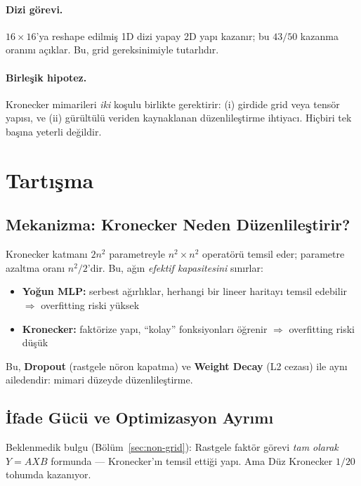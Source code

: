 \documentclass[11pt,a4paper]{article}
\begin{document}
\paragraph{Dizi görevi.}
$16 \times 16$'ya reshape edilmiş 1D dizi yapay 2D yapı kazanır;
bu $43/50$ kazanma oranını açıklar. Bu, grid gereksinimiyle
tutarlıdır.

\paragraph{Birleşik hipotez.}
Kronecker mimarileri \emph{iki} koşulu birlikte gerektirir:
(i) girdide grid veya tensör yapısı, ve (ii) gürültülü veriden
kaynaklanan düzenlileştirme ihtiyacı. Hiçbiri tek başına yeterli
değildir.


\section{Tartışma}
\label{sec:discussion}

\subsection{Mekanizma: Kronecker Neden Düzenlileştirir?}

Kronecker katmanı $2n^2$ parametreyle $n^2 \times n^2$ operatörü
temsil eder; parametre azaltma oranı $n^2/2$'dir. Bu,
ağın \emph{efektif kapasitesini} sınırlar:

\begin{itemize}
\item \textbf{Yoğun MLP:} serbest ağırlıklar, herhangi bir lineer
haritayı temsil edebilir $\Rightarrow$ overfitting riski yüksek
\item \textbf{Kronecker:} faktörize yapı, ``kolay'' fonksiyonları
öğrenir $\Rightarrow$ overfitting riski düşük
\end{itemize}

Bu, \textbf{Dropout} \cite{srivastava2014dropout} (rastgele nöron
kapatma) ve \textbf{Weight Decay} \cite{krogh1991simple} (L2
cezası) ile aynı ailedendir: mimari düzeyde düzenlileştirme.

\subsection{İfade Gücü ve Optimizasyon Ayrımı}

Beklenmedik bulgu (Bölüm~\ref{sec:non-grid}): Rastgele faktör
görevi \emph{tam olarak} $Y = AXB$ formunda --- Kronecker'ın
temsil ettiği yapı. Ama Düz Kronecker $1/20$ tohumda kazanıyor.
\end{document}
